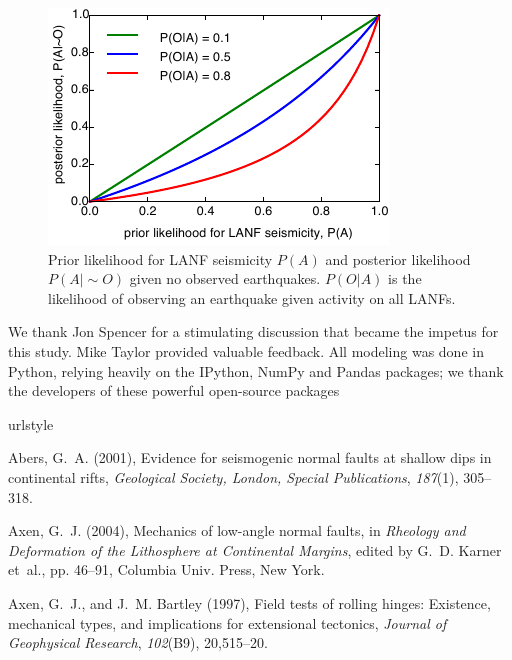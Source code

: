 \documentclass[twocolumn,grl]{AGUTeX}
\begin{document}
\begin{article}
\begin{figure}%
 \noindent\includegraphics{./figures/posteriors.pdf}
 \caption{Prior likelihood for LANF seismicity $P(A)$ and posterior
 likelihood $P(A|\sim O)$ given no observed earthquakes.  
 $P(O|A)$ is the likelihood of observing an earthquake given activity
 on all LANFs.}
 \label{fig:posteriors}
\end{figure}

\begin{acknowledgements}
  We thank Jon Spencer for a stimulating discussion that became the
  impetus for this study.  Mike Taylor provided valuable feedback.
  All modeling was done in Python, relying heavily
  on the IPython, NumPy and Pandas packages; we thank the developers of these 
  powerful open-source packages
\end{acknowledgements}

\begin{thebibliography}{28}
\providecommand{\natexlab}[1]{#1}
\expandafter\ifx\csname urlstyle\endcsname\relax
  \providecommand{\doi}[1]{doi:\discretionary{}{}{}#1}\else
  \providecommand{\doi}{doi:\discretionary{}{}{}\begingroup
  \urlstyle{rm}\Url}\fi

Abers, G.~A. (2001), Evidence for seismogenic normal faults at shallow dips in
  continental rifts, \textit{Geological Society, London, Special Publications},
  \textit{187}(1), 305--318.

Axen, G.~J. (2004), Mechanics of low-angle normal faults, in \textit{Rheology
  and Deformation of the Lithosphere at Continental Margins}, edited by G.~D.
  Karner et~al., pp. 46--91, Columbia Univ. Press, New York.

Axen, G.~J., and J.~M. Bartley (1997), Field tests of rolling hinges:
  Existence, mechanical types, and implications for extensional tectonics,
  \textit{Journal of Geophysical Research}, \textit{102}(B9), 20,515--20.


\end{thebibliography}
\end{article}
\end{document}
